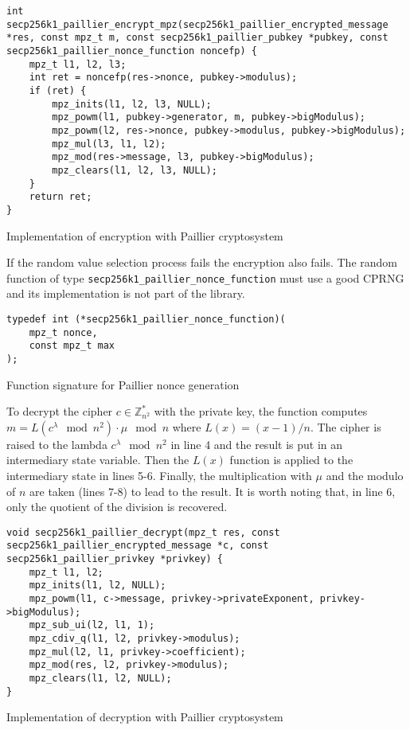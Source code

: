 \begin{listing}
  \begin{verbatim}
int secp256k1_paillier_encrypt_mpz(secp256k1_paillier_encrypted_message *res, const mpz_t m, const secp256k1_paillier_pubkey *pubkey, const secp256k1_paillier_nonce_function noncefp) {
    mpz_t l1, l2, l3;
    int ret = noncefp(res->nonce, pubkey->modulus);
    if (ret) {
        mpz_inits(l1, l2, l3, NULL);
        mpz_powm(l1, pubkey->generator, m, pubkey->bigModulus);
        mpz_powm(l2, res->nonce, pubkey->modulus, pubkey->bigModulus);
        mpz_mul(l3, l1, l2);
        mpz_mod(res->message, l3, pubkey->bigModulus);
        mpz_clears(l1, l2, l3, NULL);
    }
    return ret;
}
  \end{verbatim}
	\caption{Implementation of encryption with Paillier cryptosystem}
	\label{lst:implEncryptPaillier}
\end{listing}

If the random value selection process fails the encryption also fails. The
random function of type \texttt{secp256k1\_paillier\_nonce\_function} must use a
good CPRNG and its implementation is not part of the library.

\begin{listing}
  \begin{verbatim}
typedef int (*secp256k1_paillier_nonce_function)(
    mpz_t nonce,
    const mpz_t max
);
  \end{verbatim}
	\caption{Function signature for Paillier nonce generation}
	\label{lst:PaillierNoncesSigFunc}
\end{listing}

To decrypt the cipher $c \in \mathbb{Z}_{n^2}^*$ with the private key, the
function computes $m = L(c^{\lambda} \mod n^2) \cdot \mu \mod n$ where $L(x) = (x -
1) / n$. The cipher is raised to the lambda $c^{\lambda} \mod n^2$ in line 4 and
the result is put in an intermediary state variable. Then the $L(x)$ function is
applied to the intermediary state in lines 5-6. Finally, the multiplication with
$\mu$ and the modulo of $n$ are taken (lines 7-8) to lead to the result. It is
worth noting that, in line 6, only the quotient of the division is recovered.

\begin{listing}
  \begin{verbatim}
void secp256k1_paillier_decrypt(mpz_t res, const secp256k1_paillier_encrypted_message *c, const secp256k1_paillier_privkey *privkey) {
    mpz_t l1, l2;
    mpz_inits(l1, l2, NULL);
    mpz_powm(l1, c->message, privkey->privateExponent, privkey->bigModulus);
    mpz_sub_ui(l2, l1, 1);
    mpz_cdiv_q(l1, l2, privkey->modulus);
    mpz_mul(l2, l1, privkey->coefficient);
    mpz_mod(res, l2, privkey->modulus);
    mpz_clears(l1, l2, NULL);
}
  \end{verbatim}
	\caption{Implementation of decryption with Paillier cryptosystem}
	\label{lst:implDecryptPaillier}
\end{listing}

